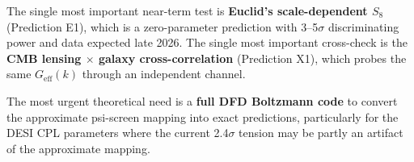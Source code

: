 \documentclass[12pt]{article}
\begin{document}
The single most important near-term test is \textbf{Euclid's scale-dependent $S_8$} (Prediction E1), which is a zero-parameter prediction with 3--5$\sigma$ discriminating power and data expected late 2026. The single most important cross-check is the \textbf{CMB lensing $\times$ galaxy cross-correlation} (Prediction X1), which probes the same $G_\mathrm{eff}(k)$ through an independent channel.

The most urgent theoretical need is a \textbf{full DFD Boltzmann code} to convert the approximate psi-screen mapping into exact predictions, particularly for the DESI CPL parameters where the current 2.4$\sigma$ tension may be partly an artifact of the approximate mapping.
\end{document}
